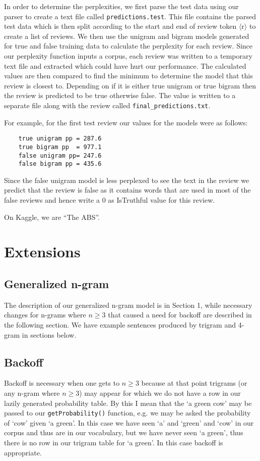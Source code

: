 \documentclass{article}
\begin{document}
In order to determine the perplexities, we first parse the test data using our parser to create a text file called \texttt{predictions.test}. This file contains the parsed test data which is then split according to the start and end of review token $\langle$r$\rangle$ to create a list of reviews. We then use the unigram and bigram models generated for true and false training data to calculate the perplexity for each review. Since our perplexity function inputs a corpus, each review was written to a temporary text file and extracted which could have hurt our performance. The calculated values are then compared to find the minimum to determine the model that this review is closest to. Depending on if it is either true unigram or true bigram then the review is predicted to be true otherwise false. The value is written to a separate file along with the review called \texttt{final\_predictions.txt}.\par

For example, for the first test review our values for the models were as follows:
{\small\begin{verbatim}
    true unigram pp = 287.6
    true bigram pp  = 977.1
    false unigram pp= 247.6
    false bigram pp = 435.6
\end{verbatim}}

Since the false unigram model is less perplexed to see the text in the review we predict that the review is false as it contains words that are used in most of the false reviews and hence write a 0 as IsTruthful value for this review.

On Kaggle, we are ``The ABS''.

\section{Extensions}

\subsection{Generalized n-gram}
The description of our generalized n-gram model is in Section 1, while necessary changes for n-grams where $n\geq3$ that caused a need for backoff are described in the following section. We have example sentences produced by trigram and 4-gram in sections below.

\subsection{Backoff}
Backoff is necessary when one gets to $n \geq 3$ because at that point trigrams (or any n-gram where $n \geq 3$) may appear for which we do not have a row in our lazily generated probability table. By this I mean that the `a green cow' may be passed to our \texttt{getProbability()} function, e.g. we may be asked the probability of `cow' given `a green'. In this case we have seen `a' and `green' and `cow' in our corpus and thus are in our vocabulary, but we have never seen `a green', thus there is no row in our trigram table for `a green'. In this case backoff is appropriate. 
\end{document}
